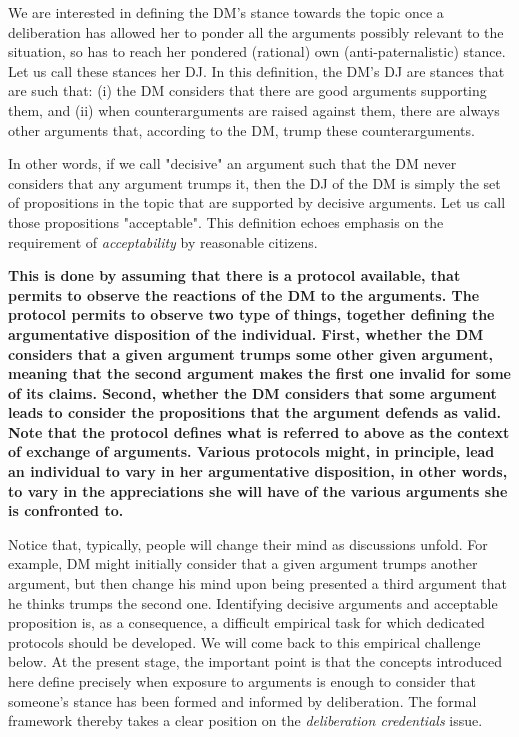 \documentclass[version=3.21, pagesize, twoside=off, bibliography=totoc, DIV=calc, fontsize=12pt, a4paper, french, english]{scrartcl}
\begin{document}

We are interested in defining the \ac{DM}’s stance towards the topic once a deliberation has allowed her to ponder all the arguments possibly relevant to the situation, so has to reach her pondered (rational) own (anti-paternalistic) stance. Let us call these stances her \ac{DJ}. In this definition, the \ac{DM}’s \ac{DJ} are stances that are such that: (i) the \ac{DM} considers that there are good arguments supporting them, and (ii) when counterarguments are raised against them, there are always other arguments that, according to the \ac{DM}, trump these counterarguments.

In other words, if we call "decisive" an argument such that the \ac{DM} never considers that any argument trumps it, then the \ac{DJ} of the \ac{DM} is simply the set of propositions in the topic that are supported by decisive arguments. Let us call those propositions "acceptable". This definition echoes  emphasis on the requirement of \emph{acceptability} by reasonable citizens. 

\textbf{This is done by assuming that there is a protocol available, that permits to observe the reactions of the \ac{DM} to the arguments. The protocol permits to observe two type of things, together defining the argumentative disposition of the individual. First, whether the \ac{DM} considers that a given argument trumps some other given argument, meaning that the second argument makes the first one invalid for some of its claims. Second, whether the \ac{DM} considers that some argument leads to consider the propositions that the argument defends as valid. Note that the protocol defines what is referred to above as the context of exchange of arguments. Various protocols might, in principle, lead an individual to vary in her argumentative disposition, in other words, to vary in the appreciations she will have of the various arguments she is confronted to.}

Notice that, typically, people will change their mind as discussions unfold. For example, \ac{DM} might initially consider that a given argument trumps another argument, but then change his mind upon being presented a third argument that he thinks trumps the second one. Identifying decisive arguments and acceptable proposition is, as a consequence, a difficult empirical task for which dedicated protocols should be developed. We will come back to this empirical challenge below. At the present stage, the important point is that the concepts introduced here define precisely when exposure to arguments is enough to consider that someone’s stance has been formed and informed by deliberation. The formal framework thereby takes a clear position on the \emph{deliberation credentials} issue.
\end{document}
